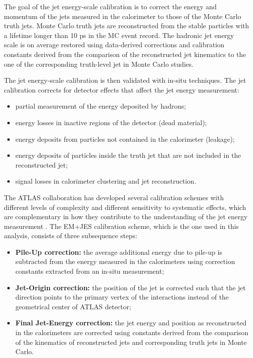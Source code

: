 \documentclass[12pt, twoside]{article}
\numberwithin{equation}{section}
\numberwithin{figure}{section}
\begin{document}
The goal of the jet energy-scale calibration is to correct the energy and momentum of the jets measured in the calorimeter to those of the Monte Carlo truth jets. Monte Carlo truth jets are reconstructed from the stable particles with a lifetime longer than 10 ps in the MC event record. The hadronic jet energy scale is on average restored using data-derived corrections and calibration constants derived from the comparison of the reconstructed jet kinematics to the one of the corresponding truth-level jet in Monte Carlo studies.

The jet energy-scale calibration is then validated with in-situ techniques. The jet calibration corrects for detector effects that affect the jet energy measurement:
\begin{itemize}
    \item partial measurement of the energy deposited by hadrons;
    \item energy losses in inactive regions of the detector (dead material);
    \item energy deposits from particles not contained in the calorimeter (leakage);
    \item energy deposits of particles inside the truth jet that are not included in the reconstructed jet;
    \item signal losses in calorimeter clustering and jet reconstruction.
\end{itemize}

The ATLAS collaboration has developed several calibration schemes with different levels of complexity and different sensitivity to systematic effects, which are complementary in how they contribute to the understanding of the jet energy measurement \cite{photonReconstruction_1, ATLAScalorimeter}. The EM+JES calibration scheme, which is the one used in this analysis, consists of three subsequence steps:
\begin{itemize}
    \item \textbf{Pile-Up correction:} the average additional energy due to pile-up is subtracted from the energy measured in the calorimeters using correction constants extracted from an in-situ measurement;
    \item \textbf{Jet-Origin correction:} the position of the jet is corrected such that the jet direction points to the primary vertex of the interactions instead of the geometrical center of ATLAS detector;
    \item \textbf{Final Jet-Energy correction:} the jet energy and position as reconstructed in the calorimeters are corrected using constants derived from the comparison of the kinematics of reconstructed jets and corresponding truth jets in Monte Carlo.
\end{itemize}
\end{document}
